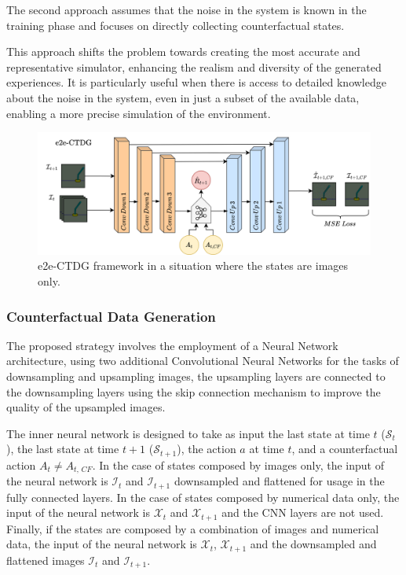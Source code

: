 The second approach assumes that the noise in the system is known
in the training phase and focuses on directly collecting
counterfactual states.

This approach shifts the problem towards creating the most
accurate and representative simulator, enhancing the
realism and diversity of the generated experiences.
It is particularly useful when there is access to detailed
knowledge about the noise in the system,
even in just a subset of the available data, enabling a more
precise simulation of the environment.

\begin{figure}[ht]
    \centering
    \includegraphics[width=\textwidth]{figures/ch4/2.e2e.png}
    \caption{e2e-CTDG framework in a situation where the states are
    images only.}
    \label{fig:e2e}
\end{figure}

\subsubsection{Counterfactual Data Generation}

The proposed strategy involves the employment of a Neural Network
architecture, using two additional Convolutional Neural Networks
for the tasks of downsampling and upsampling images,
the upsampling layers are connected to the downsampling layers
using the skip connection mechanism to improve the quality of the
upsampled images.

The inner neural network is designed to take as input the last state at
time $t$ ($\mathcal{S}_{t}$), the last state at time $t+1$
($\mathcal{S}_{t+1}$), the action $a$ at time $t$,
and a counterfactual action $A_t \neq A_{t,\, CF}$.
In the case of states composed by images only,
the input of the neural network is $\mathcal{I}_{t}$ and $\mathcal{I}_{t+1}$
downsampled and flattened for usage in the fully connected layers.
In the case of states composed by numerical data only,
the input of the neural network is $\mathcal{X}_{t}$ and $\mathcal{X}_{t+1}$
and the CNN layers are not used.
Finally, if the states are composed by a combination of images
and numerical data,
the input of the neural network is $\mathcal{X}_{t}$, $\mathcal{X}_{t+1}$ and
the downsampled and flattened images $\mathcal{I}_{t}$ and $\mathcal{I}_{t+1}$.

